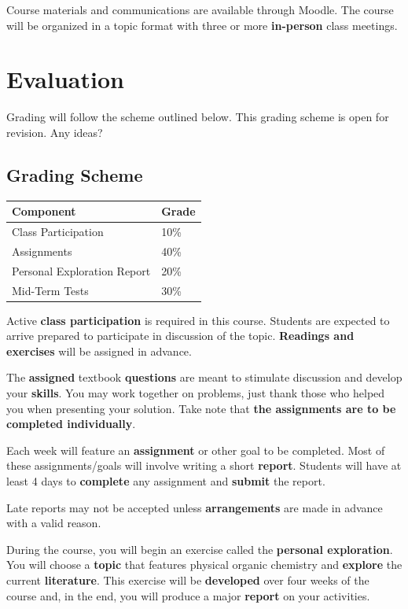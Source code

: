Course materials and communications are available through Moodle. The course will be organized in a topic format with three or more \textbf{in-person} class meetings.

\section{Evaluation}

Grading will follow the scheme outlined below. This grading scheme is open for revision. Any ideas?

\subsection{Grading Scheme}

\begin{center}
\begin{tabular}{ll}
\hline
Component & Grade \\
\hline
Class Participation & 10\% \\
Assignments & 40\% \\
Personal Exploration Report & 20\% \\
Mid-Term Tests & 30\% \\
\hline
\end{tabular}
\end{center}

Active \textbf{class participation} is required in this course. Students are expected to arrive prepared to participate in discussion of the topic. \textbf{Readings and exercises} will be assigned in advance.

The \textbf{assigned} textbook \textbf{questions} are meant to stimulate discussion and develop your \textbf{skills}. You may work together on problems, just thank those who helped you when presenting your solution. Take note that \textbf{the assignments are to be completed individually}.

Each week will feature an \textbf{assignment} or other goal to be completed. Most of these assignments/goals will involve writing a short \textbf{report}. Students will have at least 4 days to \textbf{complete} any assignment and \textbf{submit} the report.

Late reports may not be accepted unless \textbf{arrangements} are made in advance with a valid reason.

During the course, you will begin an exercise called the \textbf{personal exploration}. You will choose a \textbf{topic} that features physical organic chemistry and \textbf{explore} the current \textbf{literature}. This exercise will be \textbf{developed} over four weeks of the course and, in the end, you will produce a major \textbf{report} on your activities.

